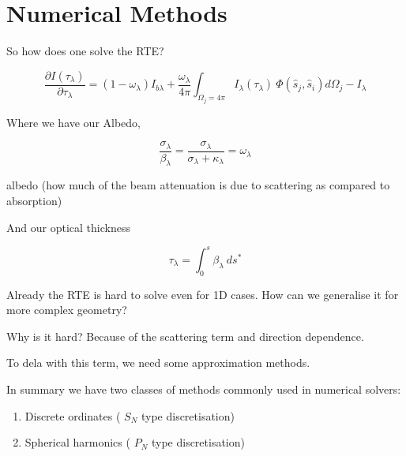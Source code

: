 \documentclass[12pt]{article}
\renewcommand{\_}{\kern-1.5pt\textunderscore\kern-1.5pt}
\begin{document}
\vspace{\baselineskip}
\section*{Numerical Methods}
So how does one solve the RTE?\par

 \[ \frac{ \partial I \left(  \tau_{ \lambda } \right) }{ \partial  \tau_{ \lambda }}= \left( 1- \omega _{ \lambda } \right)  I_{b \lambda }+\frac{ \omega _{ \lambda }}{4 \pi } \int _{ \Omega _{j}=4 \pi }^{}I_{ \lambda } \left(  \tau_{ \lambda } \right) ~ \Phi  \left( \hat{s}_{j},\hat{s}_{i} \right) d \Omega _{j}-I_{ \lambda } \] \par

Where we have our Albedo,\par

 \[ \frac{ \sigma _{ \lambda }}{ \beta _{ \lambda }}=\frac{ \sigma _{ \lambda }}{ \sigma _{ \lambda }+ \kappa _{ \lambda }}= \omega _{ \lambda } \] \par

albedo (how much of the beam attenuation is due to scattering as compared to absorption)\par

And our optical thickness\par

 \[  \tau_{ \lambda }= \int _{0}^{s} \beta _{ \lambda }~ds^{\ast} \] \par

Already the RTE is hard to solve even for 1D cases. How can we generalise it for more complex geometry?\par

Why is it hard? Because of the scattering term and direction dependence.\par


\vspace{\baselineskip}
To dela with this term, we need some approximation methods. \par

In summary we have two classes of methods commonly used in numerical solvers:\par

\begin{enumerate}
	\item Discrete ordinates ( \( S_{N} \)  type discretisation)\par

	\item Spherical harmonics ( \( P_{N} \)  type discretisation)
\end{enumerate}\par
\end{document}
